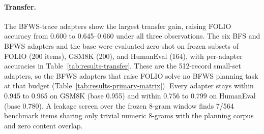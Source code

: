 \paragraph{Transfer.} The BFWS-trace adapters show the largest transfer gain, raising FOLIO accuracy from 0.600 to 0.645--0.660 under all three observations. The six BFS and BFWS adapters and the base were evaluated zero-shot on frozen subsets of FOLIO \citep{han2022folio} (200 items), GSM8K \citep{cobbe2021gsm8k} (200), and HumanEval \citep{chen2021humaneval} (164), with per-adapter accuracies in Table~\ref{tab:results-transfer}. These are the 512-record small-set adapters, so the BFWS adapters that raise FOLIO solve no BFWS planning task at that budget (Table~\ref{tab:results-primary-matrix}). Every adapter stays within 0.945 to 0.965 on GSM8K (base 0.955) and within 0.756 to 0.799 on HumanEval (base 0.780). A leakage screen over the frozen 8-gram window finds 7/564 benchmark items sharing only trivial numeric 8-grams with the planning corpus and zero content overlap.




